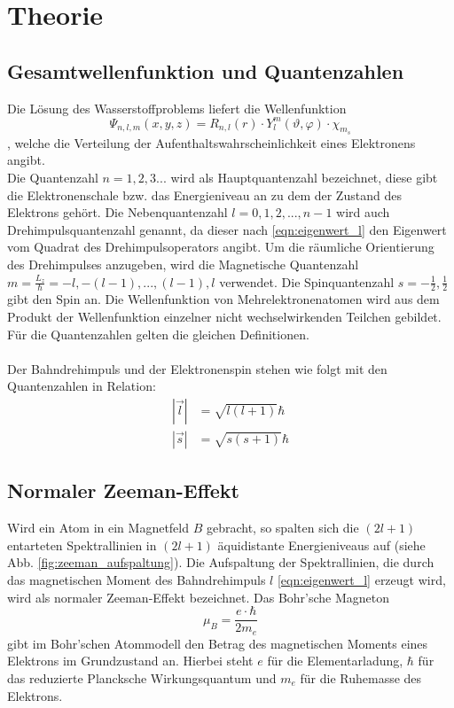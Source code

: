 \section{Theorie}
\label{sec:Theorie}

\subsection{Gesamtwellenfunktion und Quantenzahlen}
Die Lösung des Wasserstoffproblems liefert die Wellenfunktion
\begin{equation*}
    \Psi_{n, l, m} (x, y, z) = R_{n, l}(r) \cdot Y_l^m (\vartheta, \varphi) \cdot \chi_{m_s}
\end{equation*}
, welche die Verteilung der Aufenthaltswahrscheinlichkeit eines Elektronens angibt.\\
Die Quantenzahl $n = 1, 2, 3 ...$ wird als Hauptquantenzahl bezeichnet, diese gibt die Elektronenschale bzw. das Energieniveau an zu dem der Zustand des Elektrons gehört.
Die Nebenquantenzahl $l = 0, 1, 2, ..., n-1 $ wird auch Drehimpulsquantenzahl genannt, da dieser nach \autoref{eqn:eigenwert_l} den Eigenwert vom Quadrat des Drehimpulsoperators angibt. 
Um die räumliche Orientierung des Drehimpulses anzugeben, wird die Magnetische Quantenzahl $m = \frac{L_z}{\hbar} = -l, - (l-1), ..., (l-1), l$ verwendet.
Die Spinquantenzahl $s = -\frac{1}{2} , \frac{1}{2}$ gibt den Spin an.
Die Wellenfunktion von Mehrelektronenatomen wird aus dem Produkt der Wellenfunktion einzelner nicht wechselwirkenden Teilchen gebildet.
Für die Quantenzahlen gelten die gleichen Definitionen.
\\ \\
Der Bahndrehimpuls und der Elektronenspin stehen wie folgt mit den Quantenzahlen in Relation:
\begin{align}
    |\vec{l}| &= \sqrt{l(l+1)} \hbar \label{eqn:eigenwert_l} \\
    |\vec{s}| &= \sqrt{s(s+1)} \hbar \label{eqn:eigenwert_s}
\end{align}


\subsection{Normaler Zeeman-Effekt}
Wird ein Atom in ein Magnetfeld $B$ gebracht, so spalten sich die $(2l + 1)$ entarteten Spektrallinien in $(2l + 1)$ äquidistante Energieniveaus auf (siehe Abb. \ref{fig:zeeman_aufspaltung}).
Die Aufspaltung der Spektrallinien, die durch das magnetischen Moment des Bahndrehimpuls $l$ \eqref{eqn:eigenwert_l} erzeugt wird, wird als normaler Zeeman-Effekt bezeichnet.
Das Bohr'sche Magneton
\begin{equation}
    \mu_B = \frac{e \cdot \hbar}{2 m_e}
    \label{eqn:magneton}
\end{equation}
gibt im Bohr'schen Atommodell den Betrag des magnetischen Moments eines Elektrons im Grundzustand an.
Hierbei steht $e$ für die Elementarladung, $\hbar$ für das reduzierte Plancksche Wirkungsquantum und $m_e$ für die Ruhemasse des Elektrons.

